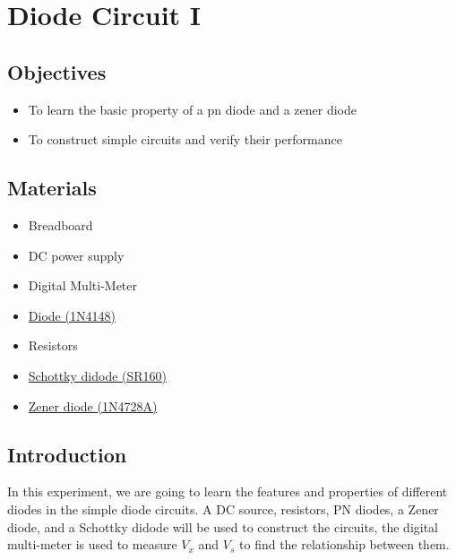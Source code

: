 \chapter{Diode Circuit I}

\section{Objectives}
\begin{itemize}
    \item To learn the basic property of a pn diode and a zener diode
    \item To construct simple circuits and verify their performance
\end{itemize}

\section{Materials}
\begin{itemize}
    \item Breadboard
    \item DC power supply
    \item Digital Multi-Meter
    \item \hyperref[1N4148]{Diode (1N4148)}
    \item Resistors
    \item \hyperref[SR160]{Schottky didode (SR160)}
    \item \hyperref[1N4728A]{Zener diode (1N4728A)}
\end{itemize}

\section{Introduction}
In this experiment, we are going to learn the features and properties of different diodes in the simple diode circuits. A DC source, resistors, PN diodes, a Zener diode, and a Schottky didode will be used to construct the circuits, the digital multi-meter is used to measure $V_x$ and $V_s$ to find the relationship between them.\par
